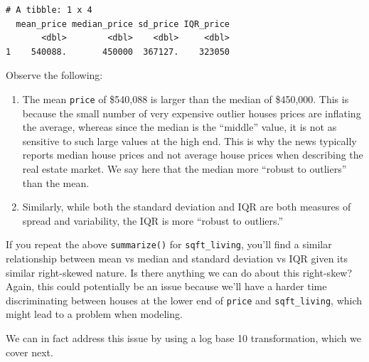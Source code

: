\documentclass[12pt,]{krantz}
\makeatletter
\newenvironment{Shaded}{\begin{snugshade}}{\end{snugshade}}
\newcommand{\KeywordTok}[1]{\textcolor[rgb]{0.27,0.27,0.27}{\textbf{#1}}}
\newcommand{\DataTypeTok}[1]{\textcolor[rgb]{0.27,0.27,0.27}{#1}}
\newcommand{\StringTok}[1]{\textcolor[rgb]{0.5,0.5,0.5}{#1}}
\newcommand{\OperatorTok}[1]{\textcolor[rgb]{0.43,0.43,0.43}{\textbf{#1}}}
\newcommand{\NormalTok}[1]{#1}
\providecommand{\tightlist}{%
  \setlength{\itemsep}{0pt}\setlength{\parskip}{0pt}}
\newenvironment{kframe}{%
\medskip{}
\setlength{\fboxsep}{.8em}
 \def\at@end@of@kframe{}%
 \ifinner\ifhmode%
  \def\at@end@of@kframe{\end{minipage}}%
  \begin{minipage}{\columnwidth}%
 \fi\fi%
 \def\FrameCommand##1{\hskip\@totalleftmargin \hskip-\fboxsep
 \colorbox{shadecolor}{##1}\hskip-\fboxsep
     \hskip-\linewidth \hskip-\@totalleftmargin \hskip\columnwidth}%
 \MakeFramed {\advance\hsize-\width
   \@totalleftmargin\z@ \linewidth\hsize
   \@setminipage}}%
 {\par\unskip\endMakeFramed%
 \at@end@of@kframe}
\renewenvironment{Shaded}{\begin{kframe}}{\end{kframe}}
\theoremstyle{definition}
\theoremstyle{definition}
\theoremstyle{definition}
\theoremstyle{remark}
\makeatother
\begin{document}
\begin{Shaded}
\end{Shaded}

\begin{verbatim}
# A tibble: 1 x 4
  mean_price median_price sd_price IQR_price
       <dbl>        <dbl>    <dbl>     <dbl>
1    540088.       450000  367127.    323050
\end{verbatim}

Observe the following:

\begin{enumerate}
\def\labelenumi{\arabic{enumi}.}
\tightlist
\item
  The mean \texttt{price} of \$540,088 is larger than the median of
  \$450,000. This is because the small number of very expensive outlier
  houses prices are inflating the average, whereas since the median is
  the ``middle'' value, it is not as sensitive to such large values at
  the high end. This is why the news typically reports median house
  prices and not average house prices when describing the real estate
  market. We say here that the median more ``robust to outliers'' than
  the mean.
\item
  Similarly, while both the standard deviation and IQR are both measures
  of spread and variability, the IQR is more ``robust to outliers.''
\end{enumerate}

If you repeat the above \texttt{summarize()} for \texttt{sqft\_living},
you'll find a similar relationship between mean vs median and standard
deviation vs IQR given its similar right-skewed nature. Is there
anything we can do about this right-skew? Again, this could potentially
be an issue because we'll have a harder time discriminating between
houses at the lower end of \texttt{price} and \texttt{sqft\_living},
which might lead to a problem when modeling.

We can in fact address this issue by using a log base 10 transformation,
which we cover next.
\end{document}
